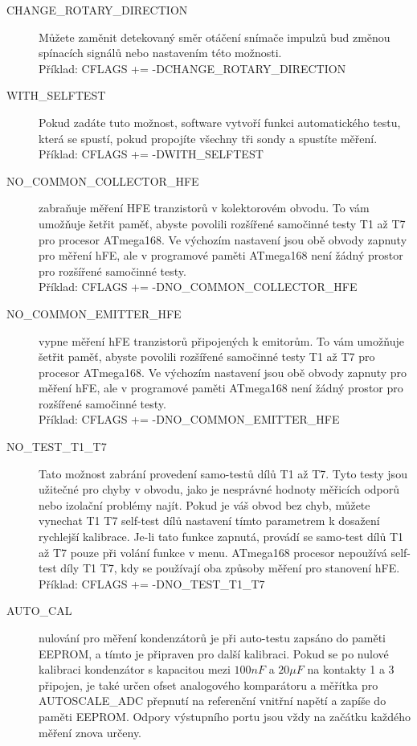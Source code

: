 \begin{description}
  \item[CHANGE\_ROTARY\_DIRECTION]  Můžete zaměnit detekovaný směr otáčení snímače impulzů bud 
změnou spínacích signálů nebo nastavením této možnosti.\\
Příklad: CFLAGS += -DCHANGE\_ROTARY\_DIRECTION
 \item[WITH\_SELFTEST]  Pokud zadáte tuto možnost, software vytvoří funkci automatického testu,
která se spustí, pokud propojíte všechny tři sondy a spustíte měření.\\
Příklad: CFLAGS += -DWITH\_SELFTEST
  \item[NO\_COMMON\_COLLECTOR\_HFE]  zabraňuje měření HFE tranzistorů v kolektorovém obvodu.
To vám umožňuje šetřit paměť, abyste povolili rozšířené samočinné testy T1 až T7 pro procesor ATmega168.
Ve výchozím nastavení jsou obě obvody zapnuty pro měření hFE,
ale v programové paměti ATmega168 není žádný prostor pro rozšířené samočinné testy.\\
Příklad: CFLAGS += -DNO\_COMMON\_COLLECTOR\_HFE
  \item[NO\_COMMON\_EMITTER\_HFE] vypne měření hFE tranzistorů připojených k emitorům.
To vám umožňuje šetřit paměť, abyste povolili rozšířené samočinné testy T1 až T7 pro procesor ATmega168.
Ve výchozím nastavení jsou obě obvody zapnuty pro měření hFE,
ale v programové paměti ATmega168 není žádný prostor pro rozšířené samočinné testy.\\
Příklad: CFLAGS += -DNO\_COMMON\_EMITTER\_HFE
  \item[NO\_TEST\_T1\_T7] Tato možnost zabrání provedení samo-testů dílů T1 až T7.
Tyto testy jsou užitečné pro chyby v obvodu, jako je nesprávné hodnoty měřicích odporů nebo
izolační problémy najít.
Pokud je váš obvod bez chyb, můžete vynechat T1 T7 self-test dílů nastavení tímto
parametrem k dosažení rychlejší kalibrace.
Je-li tato funkce zapnutá, provádí se samo-test dílů T1 až T7 pouze při volání funkce  v menu.
ATmega168 procesor nepoužívá self-test díly T1 T7, kdy se používají oba způsoby měření pro stanovení hFE.\\
Příklad: CFLAGS += -DNO\_TEST\_T1\_T7
  \item[AUTO\_CAL] nulování pro měření kondenzátorů je při auto-testu zapsáno do paměti EEPROM,
a tímto je připraven pro další kalibraci.
Pokud se po nulové kalibraci kondenzátor s kapacitou mezi \(100nF\) a \(20\mu F\)  na kontakty 1 a 3 
připojen, je také určen ofset analogového komparátoru a měřítka pro AUTOSCALE\_ADC přepnutí
na referenční vnitřní napětí a zapíše do paměti EEPROM.
Odpory výstupního portu jsou vždy na začátku každého měření znova určeny.\\

\end{description}
